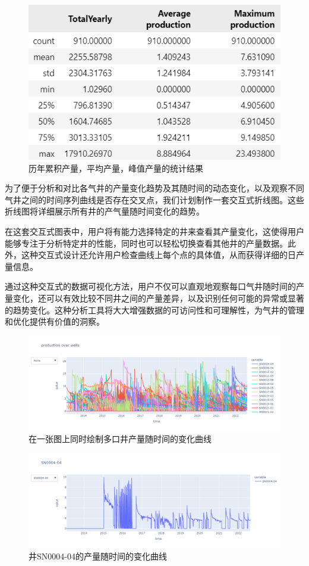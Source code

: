 \begin{figure}[H]
    \centering
    \includegraphics{figure/gasproduction.png}
    \caption{历年累积产量，平均产量，峰值产量的统计结果}
\end{figure}

为了便于分析和对比各气井的产量变化趋势及其随时间的动态变化，以及观察不同气井之间的时间序列曲线是否存在交叉点，我们计划制作一套交互式折线图。这些折线图将详细展示所有井的产气量随时间变化的趋势。

在这套交互式图表中，用户将有能力选择特定的井来查看其产量变化，这使得用户能够专注于分析特定井的性能，同时也可以轻松切换查看其他井的产量数据。此外，这种交互式设计还允许用户检查曲线上每个点的具体值，从而获得详细的日产量信息。

通过这种交互式的数据可视化方法，用户不仅可以直观地观察每口气井随时间的产量变化，还可以有效比较不同井之间的产量差异，以及识别任何可能的异常或显著的趋势变化。这种分析工具将大大增强数据的可访问性和可理解性，为气井的管理和优化提供有价值的洞察。
\begin{figure}[H]
    \centering
    \includegraphics[scale=0.3,angle=0]{figure/productiongraph.png}
    \caption{在一张图上同时绘制多口井产量随时间的变化曲线}
    \label{fig:productionchange}
\end{figure}
\begin{figure}[H]
    \centering
    \includegraphics[scale=0.3,angle=0]{figure/awellgraph.png}
    \caption{井SN0004-04的产量随时间的变化曲线}
\end{figure}
